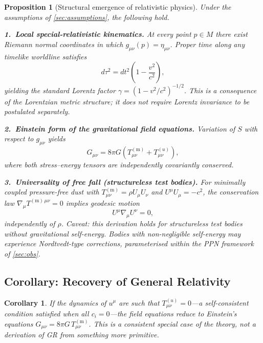 \documentclass[12pt,a4paper]{article}
\newtheorem{proposition}{Proposition}
\newtheorem{corollary}{Corollary}[proposition]
\newcommand{\Tmm}{T^{(\mathrm{m})}_{\mu\nu}}
\newcommand{\Tuu}{T^{(u)}_{\mu\nu}}
\begin{document}
\begin{proposition}[Structural emergence of relativistic physics]
\label{prop:main}
Under the assumptions of \cref{sec:assumptions}, the following hold.

\smallskip\noindent
\textbf{1.\ Local special-relativistic kinematics.}
At every point $p\in M$ there exist Riemann normal coordinates in which
$g_{\mu\nu}(p)=\eta_{\mu\nu}$. Proper time along any timelike worldline
satisfies
\begin{equation}
  d\tau^{2}=dt^{2}\!\left(1-\frac{v^{2}}{c^{2}}\right),
\end{equation}
yielding the standard Lorentz factor $\gamma=(1-v^{2}/c^{2})^{-1/2}$. This
is a consequence of the Lorentzian metric structure; it does not require
Lorentz invariance to be postulated separately.

\smallskip\noindent
\textbf{2.\ Einstein form of the gravitational field equations.}
Variation of $S$ with respect to $g_{\mu\nu}$ yields
\begin{equation}
  G_{\mu\nu}=8\pi G\!\left(\Tmm+\Tuu\right),
  \label{eq:field_eqs}
\end{equation}
where both stress--energy tensors are independently covariantly conserved.

\smallskip\noindent
\textbf{3.\ Universality of free fall (structureless test bodies).}
For minimally coupled pressure-free dust with
$\Tmm=\rho U_{\mu}U_{\nu}$ and $U^{\mu}U_{\mu}=-c^{2}$,
the conservation law $\nabla_{\!\mu}T^{(\mathrm{m})\,\mu\nu}=0$ implies
geodesic motion
\begin{equation}
  U^{\mu}\nabla_{\!\mu}U^{\nu}=0,
\end{equation}
independently of $\rho$. \emph{Caveat:} this derivation holds for
structureless test bodies without gravitational self-energy. Bodies with
non-negligible self-energy may experience Nordtvedt-type corrections,
parameterised within the PPN framework of \cref{sec:obs}.
\end{proposition}

\subsection{Corollary: Recovery of General Relativity}


\begin{corollary}
If the dynamics of $u^{\mu}$ are such that $\Tuu=0$---a self-consistent
condition satisfied when all $c_{i}=0$---the field equations reduce to
Einstein's equations $G_{\mu\nu}=8\pi G\,\Tmm$. This is a consistent
special case of the theory, not a derivation of GR from something more
primitive.
\end{corollary}
\end{document}
